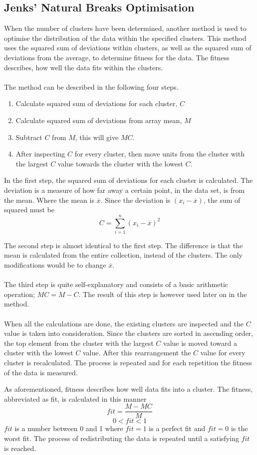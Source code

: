 \subsection{Jenks' Natural Breaks Optimisation}
\label{sub:jenks}
When the number of clusters have been determined, another method is used to optimise the distribution of the data within the specified clusters. This method uses the squared sum of deviations within clusters, as well as the squared sum of deviations from the average, to determine fitness for the data. The fitness describes, how well the data fits within the clusters.
\\\\
The method can be described in the following four steps.
\begin{enumerate}
  \item Calculate squared sum of deviations for each cluster, $C$
  \item Calculate squared sum of deviations from array mean, $M$
  \item Subtract $C$ from $M$, this will give $MC$.
  \item After inspecting $C$ for every cluster, then move units from the cluster with the largest $C$ value towards the cluster with the lowest $C$.
\end{enumerate}
In the first step, the squared sum of deviations for each cluster is calculated. The deviation is a measure of how far away a certain point, in the data set, is from the mean. Where the mean is $\overline{x}$. Since the deviation is $(x_i-\overline{x})$, the sum of squared must be $$C= \displaystyle\sum_{i=1}^{n}(x_i-\overline{x})^2$$

The second step is almost identical to the first step. The difference is that the mean is calculated from the entire collection, instead of the clusters. The only modifications would be to change $\overline{x}$.
\\\\
The third step is quite self-explanatory and consists of a basic arithmetic operation; $MC = M-C$. The result of this step is however used later on in the method.
\\\\
When all the calculations are done, the existing clusters are inspected and the $C$ value is taken into consideration. Since the clusters are sorted in ascending order, the top element from the cluster with the largest $C$ value is moved toward a cluster with the lowest $C$ value. After this rearrangement the $C$ value for every cluster is recalculated. The process is repeated and for each repetition the fitness of the data is measured.


As aforementioned, fitness describes how well data fits into a cluster. The fitness, abbreviated as fit, is calculated in this manner $$fit = \frac{M-MC}{M}$$
$$0<fit<1$$
$fit$ is a number between 0 and 1 where $fit = 1$ is a perfect fit and $fit = 0$ is the worst fit.
The process of redistributing the data is repeated until a satisfying $fit$ is reached.

